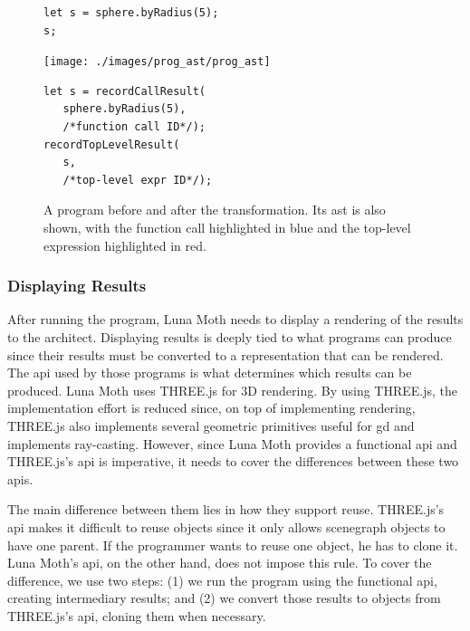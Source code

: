 \begin{figure}
  \centering
\begin{minipage}[c]{0.3\linewidth}
  \begin{verbatim}
let s = sphere.byRadius(5);
s;
  \end{verbatim}
\end{minipage}%
\hspace{0.045\linewidth}%
\begin{minipage}[c]{0.3\linewidth}
  \texttt{[image: ./images/prog\_ast/prog\_ast]}
\end{minipage}%
\hspace{0.045\linewidth}%
\begin{minipage}[c]{0.3\linewidth}
  \begin{verbatim}
let s = recordCallResult(
   sphere.byRadius(5),
   /*function call ID*/);
recordTopLevelResult(
   s,
   /*top-level expr ID*/);
  \end{verbatim}
\end{minipage}
  \caption[A program before and after the transformation.]{A program before and after the transformation. Its \gls{ast} is also shown, with the function call highlighted in blue and the top-level expression highlighted in red.}
  \label{fig:instrument:example}
\end{figure}


\subsubsection{Displaying Results}
After running the program, Luna Moth needs to display a rendering of the results to the architect.
Displaying results is deeply tied to what programs can produce since their results must be converted to a representation that can be rendered.
The \gls{api} used by those programs is what determines which results can be produced.
Luna Moth uses THREE.js for 3D rendering.
By using THREE.js, the implementation effort is reduced since, on top of implementing rendering, THREE.js also implements several geometric primitives useful for \gls{gd} and implements ray-casting.
However, since Luna Moth provides a functional \gls{api} and THREE.js's \gls{api} is imperative, it needs to cover the differences between these two \glspl{api}.

The main difference between them lies in how they support reuse.
THREE.js's \gls{api} makes it difficult to reuse objects since it only allows scenegraph objects to have one parent.
If the programmer wants to reuse one object, he has to clone it.
Luna Moth's \gls{api}, on the other hand, does not impose this rule.
To cover the difference, we use two steps:
(1) we run the program using the functional \gls{api}, creating intermediary results;
and (2) we convert those results to objects from THREE.js's \gls{api}, cloning them when necessary.

